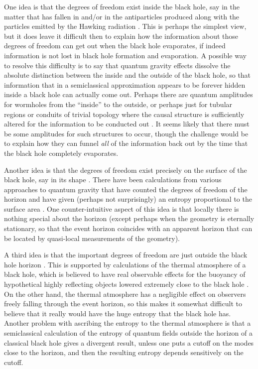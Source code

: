 \documentclass[12pt]{article} \usepackage{latexsym}
\begin{document}
One idea is that the degrees of freedom exist inside the black hole,
say in the matter that has fallen in and/or in the antiparticles
produced along with the particles emitted by the Hawking radiation
\cite{FN,BFZ}.  This is perhaps the simplest view, but it does leave
it difficult then to explain how the information about those degrees
of freedom can get out when the black hole evaporates, if indeed
information is not lost in black hole formation and evaporation.  A
possible way to resolve this difficulty is to say that quantum gravity
effects dissolve the absolute distinction between the inside and the
outside of the black hole, so that information that in a semiclassical
approximation appears to be forever hidden inside a black hole can
actually come out.  Perhaps there are quantum amplitudes for wormholes
from the ``inside'' to the outside, or perhaps just for tubular
regions or conduits of trivial topology where the causal structure is
sufficiently altered for the information to be conducted out
\cite{Pagereview}.  It seems likely that there must be some amplitudes
for such structures to occur, though the challenge would be to explain
how they can funnel {\it all} of the information back out by the time
that the black hole completely evaporates.

Another idea is that the degrees of freedom exist precisely on the
surface of the black hole, say in its shape \cite{Sor1,Sor3}.  There
have been calculations from various approaches to quantum gravity that
have counted the degrees of freedom of the horizon and have given
(perhaps not surprisingly) an entropy proportional to the surface area
\cite{Car95,Rovelli,Teitelboim,Car97,Rovelli2,Rovelli3,ABCK,AK,Car99,Car02}.
One counter-intuitive aspect of this idea is that locally there is
nothing special about the horizon (except perhaps when the geometry is
eternally stationary, so that the event horizon coincides with an
apparent horizon that can be located by quasi-local measurements of
the geometry).

A third idea is that the important degrees of freedom are just outside
the black hole horizon \cite{tHooft,BKLS,MI}.  This is supported by
calculations of the thermal atmosphere of a black hole, which is
believed to have real observable effects for the buoyancy of
hypothetical highly reflecting objects lowered extremely close to the
black hole \cite{UW}.  On the other hand, the thermal atmosphere has a
negligible effect on observers freely falling through the event
horizon, so this makes it somewhat difficult to believe that it really
would have the huge entropy that the black hole has.  Another problem
with ascribing the entropy to the thermal atmosphere is that a
semiclassical calculation of the entropy of quantum fields outside the
horizon of a classical black hole gives a divergent result, unless one
puts a cutoff on the modes close to the horizon, and then the
resulting entropy depends sensitively on the cutoff.
\end{document}
